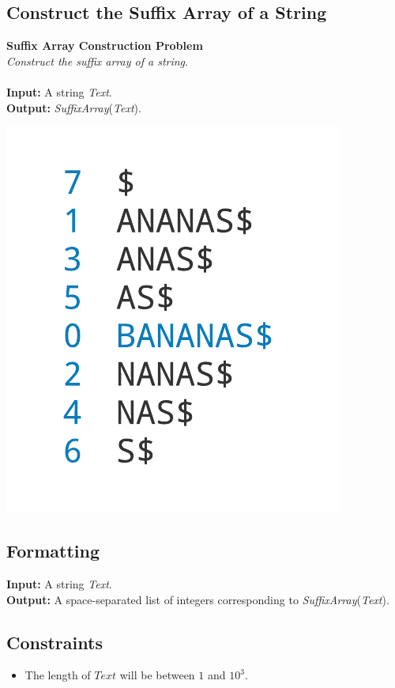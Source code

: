\documentclass{article}
\begin{document}
\subsection{Construct the Suffix Array of a String}
\hline\vspace{5}
\textbf{Suffix Array Construction Problem}\\
\emph{Construct the suffix array of a string}.\\ \\
\textbf{Input:} A string \emph{Text}.\\
\textbf{Output:} \emph{SuffixArray}(\emph{Text}).
\begin{center}
    \includegraphics[scale=0.2]{c9/logos/9G.png} 
\end{center}
\hline\vspace{5}

\subsection*{Formatting}
\textbf{Input:} A string \emph{Text}.\\
\noindent \textbf{Output:} A space-separated list of integers corresponding to \emph{SuffixArray}(\emph{Text}).

\subsection*{Constraints}
\begin{itemize}
    \item The length of $Text$ will be between $1$ and $10^3$.
\end{itemize}
\end{document}
